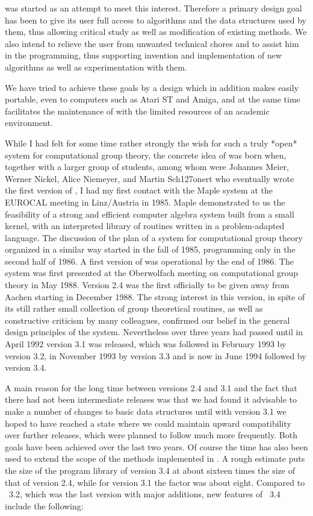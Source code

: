 {\GAP} was  started as  an attempt to meet  this  interest.   Therefore a
primary design goal has  been to give its user full access  to algorithms
and the data  structures used  by them, thus  allowing  critical study as
well as  modification of existing methods.  We also intend to relieve the
user from unwanted technical chores and to assist him in the programming,
thus supporting invention and implementation of new algorithms as well as
experimentation with them.

We have tried  to achieve these goals by a design which in addition makes
{\GAP} easily portable, even to computers such as Atari ST and Amiga, and
at the same  time facilitates the maintenance of {\GAP} with  the limited
resources of an academic environment.

While I had felt for some time rather strongly  the wish for such a truly
*open* system for computational group theory, the concrete idea of {\GAP}
was born when, together with a larger group of  students, among whom were
Johannes   Meier,    Werner   Nickel,   Alice     Niemeyer,   and  Martin
Sch\accent127onert who eventually wrote the first  version of {\GAP}, I
had my first contact   with the Maple system   at the EUROCAL  meeting in
Linz/Austria  in  1985.  Maple demonstrated   to us the feasibility  of a
strong  and efficient computer algebra system  built from a small kernel,
with an  interpreted library of   routines written in  a  problem-adapted
language.  The discussion of the plan of a system for computational group
theory organized  in    a similar  way  started  in  the  fall  of  1985,
programming only in the second half  of 1986.  A  first version of {\GAP}
was operational by  the end of 1986.  The  system was first  presented at
the Oberwolfach meeting    on computational group   theory  in May  1988.
Version  2.4  was  the first  officially  to  be  given  away from Aachen
starting in December 1988.  The strong interest in this version, in spite
of its  still rather small  collection of group theoretical  routines, as
well  as constructive criticism  by many colleagues, confirmed our belief
in the general design principles of the  system.  Nevertheless over three
years had passed until in April 1992  version 3.1 was released, which was
followed in February 1993 by version 3.2, in November 1993 by version 3.3
and is now in June 1994 followed by version 3.4.

A main reason for the long time between versions 2.4 and 3.1 and the fact
that there had not been  intermediate releases was that  we had found  it
advisable to make a number of changes to basic data structures until with
version 3.1 we  hoped  to have reached a   state where we could  maintain
upward compatibility over further  releases, which were planned to follow
much more frequently.  Both  goals have been  achieved over the last  two
years. Of course the time has  also been used to extend  the scope of the
methods implemented in {\GAP}.   A rough estimate   puts the size  of the
program library of version 3.4 at about sixteen times the size of that of
version 2.4, while for version 3.1 the factor  was about eight.  Compared
to {\GAP}~3.2,  which  was the  last version  with  major  additions, new
features of {\GAP}~3.4 include the following:

